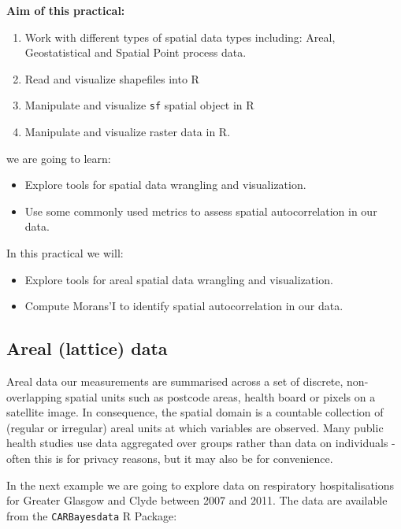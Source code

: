 \documentclass[
  letterpaper,
  DIV=11,
  numbers=noendperiod]{scrartcl}
\author{}
\date{}
\providecommand{\tightlist}{%
  \setlength{\itemsep}{0pt}\setlength{\parskip}{0pt}}\usepackage{longtable,booktabs,array}
\begin{document}
\pagestyle{mystyle}


\textbf{Aim of this practical:}

\begin{enumerate}
\def\labelenumi{\arabic{enumi}.}
\tightlist
\item
  Work with different types of spatial data types including: Areal,
  Geostatistical and Spatial Point process data.
\item
  Read and visualize shapefiles into R
\item
  Manipulate and visualize \texttt{sf} spatial object in R
\item
  Manipulate and visualize raster data in R.
\end{enumerate}

we are going to learn:

\begin{itemize}
\tightlist
\item
  Explore tools for spatial data wrangling and visualization.
\item
  Use some commonly used metrics to assess spatial autocorrelation in
  our data.
\end{itemize}

In this practical we will:

\begin{itemize}
\tightlist
\item
  Explore tools for areal spatial data wrangling and visualization.
\item
  Compute Morans'I to identify spatial autocorrelation in our data.
\end{itemize}

\subsection{Areal (lattice) data}\label{sec-areal_data}

Areal data our measurements are summarised across a set of discrete,
non-overlapping spatial units such as postcode areas, health board or
pixels on a satellite image. In consequence, the spatial domain is a
countable collection of (regular or irregular) areal units at which
variables are observed. Many public health studies use data aggregated
over groups rather than data on individuals - often this is for privacy
reasons, but it may also be for convenience.

In the next example we are going to explore data on respiratory
hospitalisations for Greater Glasgow and Clyde between 2007 and 2011.
The data are available from the \texttt{CARBayesdata} R Package:
\end{document}
